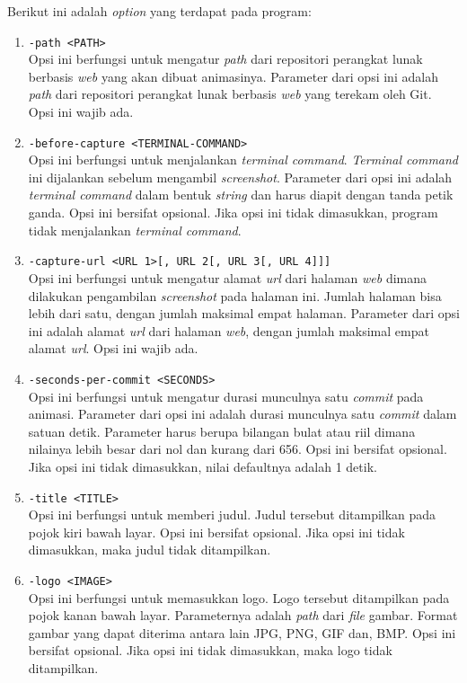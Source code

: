 Berikut ini adalah \textit{option} yang terdapat pada program:
\begin{enumerate}
\item \texttt{-path <PATH>}\\
Opsi ini berfungsi untuk mengatur \textit{path} dari repositori perangkat lunak berbasis \textit{web} yang akan dibuat animasinya. Parameter dari opsi ini adalah \textit{path} dari repositori perangkat lunak berbasis \textit{web} yang terekam oleh Git. Opsi ini wajib ada.

\item \texttt{-before-capture <TERMINAL-COMMAND>}\\
Opsi ini berfungsi untuk menjalankan \textit{terminal command}. \textit{Terminal command} ini dijalankan sebelum mengambil \textit{screenshot}. Parameter dari opsi ini adalah \textit{terminal command} dalam bentuk \textit{string} dan harus diapit dengan tanda petik ganda. Opsi ini bersifat opsional. Jika opsi ini tidak dimasukkan, program tidak menjalankan \textit{terminal command}.

\item \texttt{-capture-url <URL 1>[, URL 2[, URL 3[, URL 4]]]}\\
Opsi ini berfungsi untuk mengatur alamat \textit{url} dari halaman \textit{web} dimana dilakukan pengambilan \textit{screenshot} pada halaman ini. Jumlah halaman bisa lebih dari satu, dengan jumlah maksimal empat halaman. Parameter dari opsi ini adalah alamat \textit{url} dari halaman \textit{web}, dengan jumlah maksimal empat alamat \textit{url}. Opsi ini wajib ada.

\item \texttt{-seconds-per-commit <SECONDS>}\\
Opsi ini berfungsi untuk mengatur durasi munculnya satu \textit{commit} pada animasi. Parameter dari opsi ini adalah durasi munculnya satu \textit{commit} dalam satuan detik. Parameter harus berupa bilangan bulat atau riil dimana nilainya lebih besar dari nol dan kurang dari 656. Opsi ini bersifat opsional. Jika opsi ini tidak dimasukkan, nilai defaultnya adalah 1 detik.

\item \texttt{-title <TITLE>}\\
Opsi ini berfungsi untuk memberi judul. Judul tersebut ditampilkan pada pojok kiri
bawah layar. Opsi ini bersifat opsional. Jika opsi ini tidak dimasukkan, maka judul tidak ditampilkan.  

\item \texttt{-logo <IMAGE>}\\
Opsi ini berfungsi untuk memasukkan logo. Logo tersebut ditampilkan pada pojok kanan
bawah layar. Parameternya adalah \textit{path} dari \textit{file} gambar. Format gambar yang dapat diterima antara lain JPG, PNG, GIF dan, BMP. Opsi ini bersifat opsional. Jika opsi ini tidak dimasukkan, maka logo tidak ditampilkan.


\end{enumerate}
